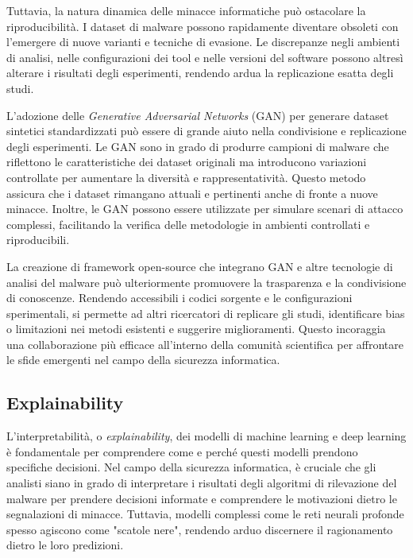 Tuttavia, la natura dinamica delle minacce informatiche può ostacolare la riproducibilità. I dataset di malware possono rapidamente diventare obsoleti con l'emergere di nuove varianti e tecniche di evasione. Le discrepanze negli ambienti di analisi, nelle configurazioni dei tool e nelle versioni del software possono altresì alterare i risultati degli esperimenti, rendendo ardua la replicazione esatta degli studi.

L'adozione delle \emph{Generative Adversarial Networks} (GAN) per generare dataset sintetici standardizzati può essere di grande aiuto nella condivisione e replicazione degli esperimenti. Le GAN sono in grado di produrre campioni di malware che riflettono le caratteristiche dei dataset originali ma introducono variazioni controllate per aumentare la diversità e rappresentatività. Questo metodo assicura che i dataset rimangano attuali e pertinenti anche di fronte a nuove minacce. Inoltre, le GAN possono essere utilizzate per simulare scenari di attacco complessi, facilitando la verifica delle metodologie in ambienti controllati e riproducibili.

La creazione di framework open-source che integrano GAN e altre tecnologie di analisi del malware può ulteriormente promuovere la trasparenza e la condivisione di conoscenze. Rendendo accessibili i codici sorgente e le configurazioni sperimentali, si permette ad altri ricercatori di replicare gli studi, identificare bias o limitazioni nei metodi esistenti e suggerire miglioramenti. Questo incoraggia una collaborazione più efficace all'interno della comunità scientifica per affrontare le sfide emergenti nel campo della sicurezza informatica.


\subsection{Explainability}

L'interpretabilità, o \emph{explainability}, dei modelli di machine learning e deep learning è fondamentale per comprendere come e perché questi modelli prendono specifiche decisioni. Nel campo della sicurezza informatica, è cruciale che gli analisti siano in grado di interpretare i risultati degli algoritmi di rilevazione del malware per prendere decisioni informate e comprendere le motivazioni dietro le segnalazioni di minacce. Tuttavia, modelli complessi come le reti neurali profonde spesso agiscono come "scatole nere", rendendo arduo discernere il ragionamento dietro le loro predizioni.

